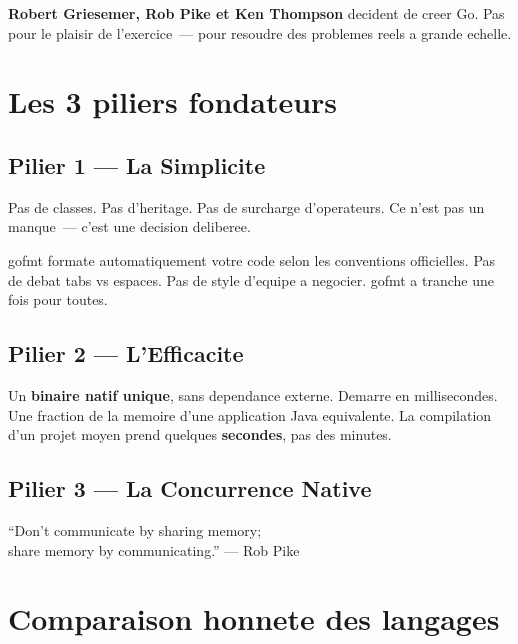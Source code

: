 \documentclass[11pt,a4paper,openany]{book}
\newcommand{\code}[1]{%
  \colorbox{GoLightGrey}{\small\ttfamily\color{GoDark}#1}}
\begin{document}
\textbf{Robert Griesemer, Rob Pike et Ken Thompson} decident de creer Go.
Pas pour le plaisir de l'exercice~--- pour resoudre des problemes reels
a grande echelle.

\section{Les 3 piliers fondateurs}

\subsection{Pilier 1 --- La Simplicite}

Pas de classes. Pas d'heritage. Pas de surcharge d'operateurs.
Ce n'est pas un manque~--- c'est une decision deliberee.

\begin{boiteConseil}
\code{gofmt} formate automatiquement votre code selon les conventions
officielles. Pas de debat tabs vs espaces. Pas de style d'equipe a negocier.
\code{gofmt} a tranche une fois pour toutes.
\end{boiteConseil}

\subsection{Pilier 2 --- L'Efficacite}

Un \textbf{binaire natif unique}, sans dependance externe. Demarre en
millisecondes. Une fraction de la memoire d'une application Java equivalente.
La compilation d'un projet moyen prend quelques \textbf{secondes}, pas des minutes.

\subsection{Pilier 3 --- La Concurrence Native}

\begin{boiteCitation}
``Don't communicate by sharing memory;\\
share memory by communicating.''
\hfill --- Rob Pike
\end{boiteCitation}

\section{Comparaison honnete des langages}
\end{document}
